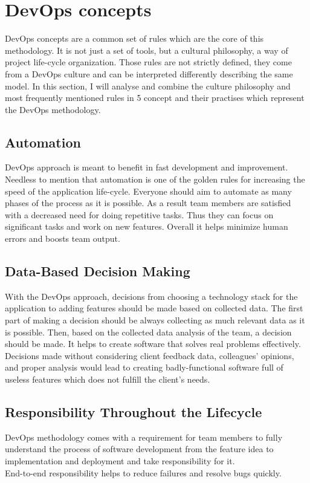 \section{DevOps concepts} DevOps concepts are a common set of rules which are the core of this methodology. It is not just a set of tools, but a cultural philosophy, a way of project life-cycle organization. Those rules are not strictly defined, they come from a DevOps culture and can be interpreted differently describing the same model. In this section, I will analyse and combine the culture philosophy and most frequently mentioned rules\cite{devops-conc1, devops-conc2} in 5 concept and their practises which represent the DevOps methodology.

\subsection{Automation} DevOps approach is meant to benefit in fast development and improvement. Needless to mention that automation is one of the golden rules for increasing the speed of the application life-cycle. Everyone should aim to automate as many phases of the process as it is possible. As a result team members are satisfied with a decreased need for doing repetitive tasks. Thus they can focus on significant tasks and work on new features. Overall it helps minimize human errors and boosts team output.

\subsection{Data-Based Decision Making} With the DevOps approach, decisions from choosing a technology stack for the application to adding features should be made based on collected data. The first part of making a decision should be always collecting as much relevant data as it is possible. Then, based on the collected data analysis of the team, a decision should be made. It helps to create software that solves real problems effectively. Decisions made without considering client feedback data, colleagues' opinions, and proper analysis would lead to creating badly-functional software full of useless features which does not fulfill the client's needs. 

\subsection{Responsibility Throughout the Lifecycle} DevOps methodology comes with a requirement for team members to fully understand the process of software development from the feature idea to implementation and deployment and take responsibility for it.\\
End-to-end responsibility helps to reduce failures and resolve bugs quickly.

